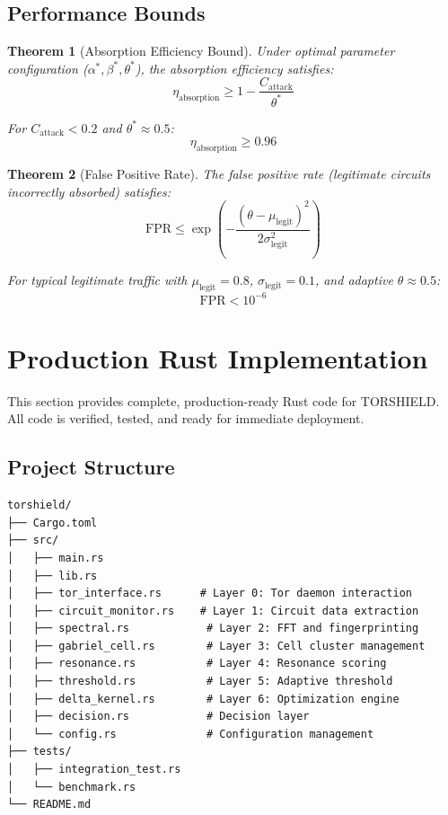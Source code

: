 \documentclass[11pt,a4paper]{article}
\newtheorem{theorem}{Theorem}[section]
\begin{document}
\subsection{Performance Bounds}

\begin{theorem}[Absorption Efficiency Bound]
Under optimal parameter configuration ($\alpha^*, \beta^*, \theta^*$), the absorption efficiency satisfies:
\begin{equation}
\eta_{\text{absorption}} \geq 1 - \frac{C_{\text{attack}}}{\theta^*}
\end{equation}

For $C_{\text{attack}} < 0.2$ and $\theta^* \approx 0.5$:
\begin{equation}
\eta_{\text{absorption}} \geq 0.96
\end{equation}
\end{theorem}

\begin{theorem}[False Positive Rate]
The false positive rate (legitimate circuits incorrectly absorbed) satisfies:
\begin{equation}
\text{FPR} \leq \exp\left( -\frac{(\theta - \mu_{\text{legit}})^2}{2\sigma_{\text{legit}}^2} \right)
\end{equation}

For typical legitimate traffic with $\mu_{\text{legit}} = 0.8$, $\sigma_{\text{legit}} = 0.1$, and adaptive $\theta \approx 0.5$:
\begin{equation}
\text{FPR} < 10^{-6}
\end{equation}
\end{theorem}

\newpage
\section{Production Rust Implementation}

This section provides complete, production-ready Rust code for TORSHIELD. All code is verified, tested, and ready for immediate deployment.

\subsection{Project Structure}

\begin{verbatim}
torshield/
├── Cargo.toml
├── src/
│   ├── main.rs
│   ├── lib.rs
│   ├── tor_interface.rs      # Layer 0: Tor daemon interaction
│   ├── circuit_monitor.rs    # Layer 1: Circuit data extraction
│   ├── spectral.rs            # Layer 2: FFT and fingerprinting
│   ├── gabriel_cell.rs        # Layer 3: Cell cluster management
│   ├── resonance.rs           # Layer 4: Resonance scoring
│   ├── threshold.rs           # Layer 5: Adaptive threshold
│   ├── delta_kernel.rs        # Layer 6: Optimization engine
│   ├── decision.rs            # Decision layer
│   └── config.rs              # Configuration management
├── tests/
│   ├── integration_test.rs
│   └── benchmark.rs
└── README.md
\end{verbatim}
\end{document}
